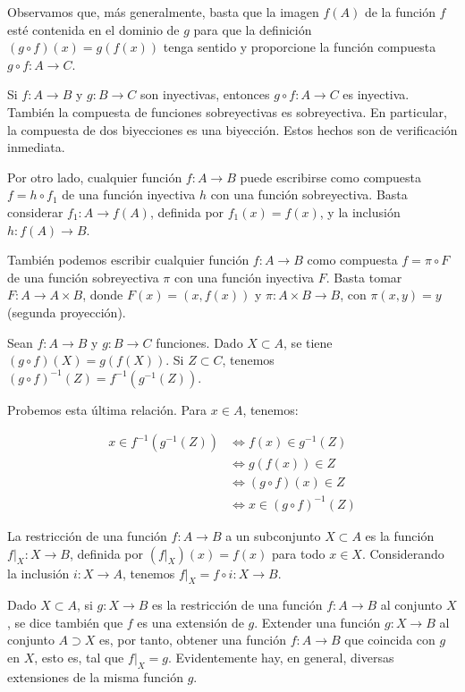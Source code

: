 \documentclass[12pt,oneside]{book}
\begin{document}
Observamos que, más generalmente, basta que la imagen \(f(A)\) de la función \(f\) esté contenida en el dominio de \(g\) para que la definición \((g \circ f)(x) = g(f(x))\) tenga sentido y proporcione la función compuesta \(g \circ f: A \to C\).

Si \(f: A \to B\) y \(g: B \to C\) son inyectivas, entonces \(g \circ f: A \to C\) es inyectiva. También la compuesta de funciones sobreyectivas es sobreyectiva. En particular, la compuesta de dos biyecciones es una biyección. Estos hechos son de verificación inmediata.

Por otro lado, cualquier función \(f: A \to B\) puede escribirse como compuesta \(f = h \circ f_1\) de una función inyectiva \(h\) con una función sobreyectiva. Basta considerar \(f_1: A \to f(A)\), definida por \(f_1(x) = f(x)\), y la inclusión \(h: f(A) \to B\).

También podemos escribir cualquier función \(f: A \to B\) como compuesta \(f = \pi \circ F\) de una función sobreyectiva \(\pi\) con una función inyectiva \(F\). Basta tomar \(F: A \to A \times B\), donde \(F(x) = (x, f(x))\) y \(\pi: A \times B \to B\), con \(\pi(x, y) = y\) (segunda proyección).

Sean \(f: A \to B\) y \(g: B \to C\) funciones. Dado \(X \subset A\), se tiene \((g \circ f)(X) = g(f(X))\). Si \(Z \subset C\), tenemos \((g \circ f)^{-1}(Z) = f^{-1}(g^{-1}(Z))\).

Probemos esta última relación. Para \(x \in A\), tenemos:

\begin{align*}
x \in f^{-1}(g^{-1}(Z)) &\iff f(x) \in g^{-1}(Z) \\
&\iff g(f(x)) \in Z \\
&\iff (g \circ f)(x) \in Z \\
&\iff x \in (g \circ f)^{-1}(Z)
\end{align*}

La restricción de una función \(f: A \to B\) a un subconjunto \(X \subset A\) es la función \(f|_X: X \to B\), definida por \((f|_X)(x) = f(x)\) para todo \(x \in X\). Considerando la inclusión \(i: X \to A\), tenemos \(f|_X = f \circ i: X \to B\).

Dado \(X \subset A\), si \(g: X \to B\) es la restricción de una función \(f: A \to B\) al conjunto \(X\), se dice también que \(f\) es una extensión de \(g\). Extender una función \(g: X \to B\) al conjunto \(A \supset X\) es, por tanto, obtener una función \(f: A \to B\) que coincida con \(g\) en \(X\), esto es, tal que \(f|_X = g\). Evidentemente hay, en general, diversas extensiones de la misma función \(g\).
\end{document}
